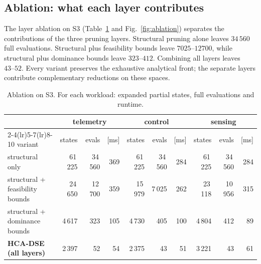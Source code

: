 \documentclass[preprint,11pt,3p]{elsarticle}
\theoremstyle{plain}
\theoremstyle{definition}
\newcommand{\SthreeEvalRange}{43\text{--}52}
\begin{document}
\FloatBarrier

\subsection{Ablation: what each layer contributes}
\providecommand{\RefFunnelSite}{Table~\ref{tab:funnel} and Fig.~\ref{fig:funnel}}
\providecommand{\RefFunnelTab}{Table~\ref{tab:funnel}}
\providecommand{\RefBaselinesTab}{Table~\ref{tab:baselines}}
\providecommand{\RefStatsTab}{Table~\ref{tab:stats}}
\providecommand{\RefHvFig}{Figure~\ref{fig:hv_budget}}
\providecommand{\RefCrossoverFig}{Fig.~\ref{fig:crossover}}
\providecommand{\RefAblationSite}{Table~\ref{tab:ablation} and Fig.~\ref{fig:ablation}}
\providecommand{\RefScalSite}{Table~\ref{tab:scalability} and Fig.~\ref{fig:scalability}}
\providecommand{\RefOrderTab}{Table~\ref{tab:order}}
\providecommand{\RefSolverTab}{Table~\ref{tab:solver}}
\providecommand{\RefDesTab}{Table~\ref{tab:des}}
\providecommand{\RefTestbedTab}{Table~\ref{tab:testbed}}
\providecommand{\RefReliabilityFig}{Fig.~\ref{fig:model_vs_measured}b}%
The layer ablation on S3 (\RefAblationSite{}) separates the contributions of the three pruning layers. Structural pruning alone leaves $34\,560$ full evaluations. Structural plus feasibility bounds leave $7025\text{--}12700$, while structural plus dominance bounds leave $323\text{--}412$. Combining all layers leaves $\SthreeEvalRange$. Every variant preserves the exhaustive analytical front; the separate layers contribute complementary reductions on these spaces.

\begin{table}[!htbp]
\centering
\caption{Ablation on S3. For each workload: expanded partial states, full evaluations and
runtime.}
\label{tab:ablation}
\scriptsize
\scriptsize
\setlength{\tabcolsep}{3.5pt}
\begin{tabular}{lrrrrrrrrr}
\toprule
& \multicolumn{3}{c}{telemetry} & \multicolumn{3}{c}{control} & \multicolumn{3}{c}{sensing} \\
\cmidrule(lr){2-4}\cmidrule(lr){5-7}\cmidrule(lr){8-10}
variant & states & evals & [ms] & states & evals & [ms] & states & evals & [ms] \\
\midrule
structural only & 61\,225 & 34\,560 & 369 & 61\,225 & 34\,560 & 284 & 61\,225 & 34\,560 & 284 \\
structural + feasibility bounds & 24\,650 & 12\,700 & 359 & 15\,979 & 7\,025 & 262 & 23\,118 & 10\,956 & 315 \\
structural + dominance bounds & 4\,617 & 323 & 105 & 4\,730 & 405 & 100 & 4\,804 & 412 & 89 \\
\textbf{HCA-DSE (all layers)} & 2\,397 & 52 & 54 & 2\,375 & 43 & 51 & 3\,221 & 43 & 61 \\
\bottomrule
\end{tabular}
\end{table}
\end{document}
